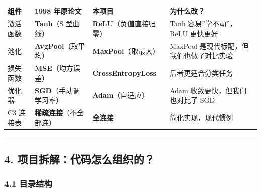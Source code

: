 \documentclass[
  11pt,
]{ctexart}
\newcounter{none} %
\begin{document}
{\def\LTcaptype{none} %
\begin{longtable}[]{@{}
  >{\raggedright\arraybackslash}p{}
  >{\raggedright\arraybackslash}p{}
  >{\raggedright\arraybackslash}p{}
  >{\raggedright\arraybackslash}p{}@{}}
\toprule\noalign{}
\begin{minipage}[b]{\linewidth}\raggedright
组件
\end{minipage} & \begin{minipage}[b]{\linewidth}\raggedright
1998 年原论文
\end{minipage} & \begin{minipage}[b]{\linewidth}\raggedright
本项目
\end{minipage} & \begin{minipage}[b]{\linewidth}\raggedright
为什么改？
\end{minipage} \\
\midrule\noalign{}
\endhead
\bottomrule\noalign{}
\endlastfoot
激活函数 & \textbf{Tanh}（S 型曲线） & \textbf{ReLU}（负值直接归零） &
Tanh 容易”学不动”，ReLU 更快更好 \\
池化 & \textbf{AvgPool}（取平均） & \textbf{MaxPool}（取最大） & MaxPool
是现代标配，但我们也做了对比实验 \\
损失函数 & \textbf{MSE}（均方误差） & \textbf{CrossEntropyLoss} &
后者更适合分类任务 \\
优化器 & \textbf{SGD}（手动调学习率） & \textbf{Adam}（自适应） & Adam
收敛更快，但我们也对比了 SGD \\
C3 连接表 & \textbf{稀疏连接}（不全部连） & \textbf{全连接} &
简化实现，现代惯例 \\
\end{longtable}
}

\begin{center}\rule{0.5\linewidth}{0.5pt}\end{center}

\subsection{4.
项目拆解：代码怎么组织的？}\label{ux9879ux76eeux62c6ux89e3ux4ee3ux7801ux600eux4e48ux7ec4ux7ec7ux7684}

\subsubsection{4.1 目录结构}\label{ux76eeux5f55ux7ed3ux6784}
\end{document}
